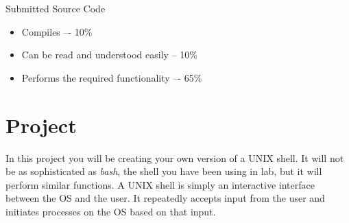 \documentclass[letterpaper,10pt]{article}
\begin{document}
Submitted Source Code
\begin{itemize}
 \item Compiles –- 10\% 
 \item Can be read and understood easily -- 10\%
 \item Performs the required functionality –- 65\%
\end{itemize}

\section{Project}
In this project you will be creating your own version of a UNIX shell. It will not be as sophisticated as \emph{bash},
the shell you have been using in lab, but it will perform similar functions.
A UNIX shell is simply an interactive interface between the OS and the user.
It repeatedly accepts input from the user and initiates processes on the OS based on that input.
\end{document}
